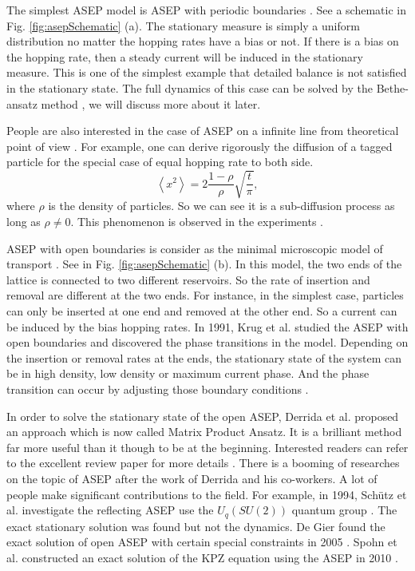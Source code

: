 The simplest ASEP model is ASEP with periodic boundaries \cite{Mallick2011b}. See a schematic in Fig. \ref{fig:asepSchematic} (a). The stationary measure is simply a uniform distribution no matter the hopping rates have a bias or not. If there is a bias on the hopping rate, then a steady current will be induced in the stationary measure. This is one of the simplest example that detailed balance is not satisfied in the stationary state. The full dynamics of this case can be solved by the Bethe-ansatz method \cite{Batchelor2007}, we will discuss more about it later. 

People are also interested in the case of ASEP on a infinite line from theoretical point of view \cite{Levitt1973,Barkai2010a,Chou2011}. For example, one can derive rigorously the diffusion of a tagged particle for the special case of equal hopping rate to both side.
\begin{equation}
    \label{eq:diffusionInfASEP}
    \left< x^2 \right> = 2 \frac{1-\rho}{\rho}\sqrt{\frac{t}{\pi}},
\end{equation}
where $\rho$ is the density of particles. So we can see it is a sub-diffusion process as long as $\rho\neq 0$. This phenomenon is observed in the experiments \cite{Chou2011}.

ASEP with open boundaries is consider as the minimal microscopic model of transport \cite{Crampe2014b, Mallick2011b}. See in Fig. \ref{fig:asepSchematic} (b). In this model, the two ends of the lattice is connected to two different reservoirs. So the rate of insertion and removal are different at the two ends. For instance, in the simplest case, particles can only be inserted at one end and removed at the other end. So a current can be induced by the bias hopping rates. In 1991, Krug et al. studied the ASEP with open boundaries and discovered the phase transitions in the model. Depending on the insertion or removal rates at the ends, the stationary state of the system can be in high density, low density or maximum current phase. And the phase transition can occur by adjusting those boundary conditions \cite{Krug1991}. 

In order to solve the stationary state of the open ASEP, Derrida et al. proposed an approach which is now called Matrix Product Ansatz. It is a brilliant method far more useful than it though to be at the beginning. Interested readers can refer to the excellent review paper for more details \cite{Derrida1998}. There is a booming of researches on the topic of ASEP after the work of Derrida and his co-workers. A lot of people make significant contributions to the field. For example, in 1994, Sch\"{u}tz et al. investigate the reflecting ASEP use the $U_q(SU(2))$ quantum group \cite{Sandow1994}. The exact stationary solution was found but not the dynamics. De Gier found the exact solution of open ASEP with certain special constraints in 2005 \cite{DeGier2005}. Spohn et al. constructed an exact solution of the KPZ equation using the ASEP in 2010 \cite{Sasamoto2010}. 

